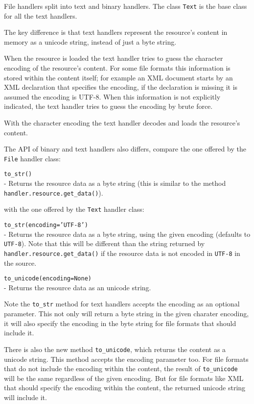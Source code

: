 File handlers split into text and binary handlers. The class {\tt Text}
is the base class for all the text handlers.

The key difference is that text handlers represent the resource's content
in memory as a unicode string, instead of just a byte string.

When the resource is loaded the text handler tries to guess the character
encoding of the resource's content. For some file formats this information
is stored within the content itself; for example an XML document starts
by an XML declaration that specifies the encoding, if the declaration is
missing it is assumed the encoding is UTF-8. When this information is not
explicitly indicated, the text handler tries to guess the encoding by
brute force.

With the character encoding the text handler decodes and loads the resource's
content.

The API of binary and text handlers also differs, compare the one offered
by the {\tt File} handler class:

\begin{api}
  {\tt to\_str()}\\
  - Returns the resource data as a byte string (this is similar to the
    method {\tt handler.resource.get\_data()}).
\end{api}

with the one offered by the {\tt Text} handler class:

\begin{api}
  {\tt to\_str(encoding='UTF-8')}\\
  - Returns the resource data as a byte string, using the given encoding
  (defaults to {\tt UTF-8}). Note that this will be different than the
  string returned by {\tt handler.resource.get\_data()} if the resource
  data is not encoded in {\tt UTF-8} in the source.

  {\tt to\_unicode(encoding=None)}\\
  - Returns the resource data as an unicode string.
\end{api}

Note the {\tt to\_str} method for text handlers accepts the encoding as
an optional parameter. This not only will return a byte string in the
given charater encoding, it will also specify the encoding in the byte
string for file formats that should include it.

There is also the new method {\tt to\_unicode}, which returns the content
as a unicode string. This method accepts the encoding parameter too. For
file formats that do not include the encoding within the content, the
result of {\tt to\_unicode} will be the same regardless of the given
encoding. But for file formats like XML that should specify the encoding
within the content, the returned unicode string will include it.



